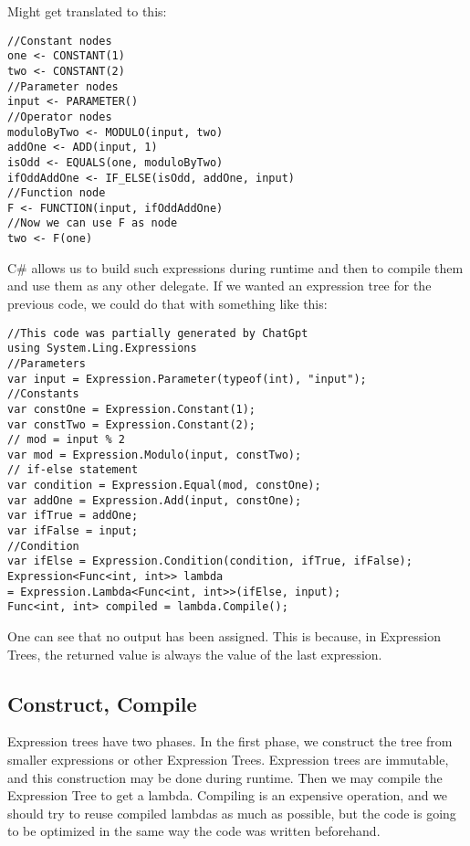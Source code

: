 Might get translated to this:
\begin{lstlisting}
//Constant nodes
one <- CONSTANT(1)
two <- CONSTANT(2)
//Parameter nodes
input <- PARAMETER()
//Operator nodes
moduloByTwo <- MODULO(input, two)
addOne <- ADD(input, 1)
isOdd <- EQUALS(one, moduloByTwo)
ifOddAddOne <- IF_ELSE(isOdd, addOne, input)
//Function node
F <- FUNCTION(input, ifOddAddOne)
//Now we can use F as node
two <- F(one)
\end{lstlisting}
    

C\# allows us to build such expressions during runtime and then to compile them and use them as any other delegate.
If we wanted an expression tree for the previous code, we could do that with something like this:

\begin{lstlisting}
//This code was partially generated by ChatGpt
using System.Ling.Expressions
//Parameters
var input = Expression.Parameter(typeof(int), "input");
//Constants
var constOne = Expression.Constant(1);
var constTwo = Expression.Constant(2);
// mod = input % 2 
var mod = Expression.Modulo(input, constTwo);
// if-else statement
var condition = Expression.Equal(mod, constOne);
var addOne = Expression.Add(input, constOne);
var ifTrue = addOne;
var ifFalse = input;
//Condition
var ifElse = Expression.Condition(condition, ifTrue, ifFalse);
Expression<Func<int, int>> lambda 
= Expression.Lambda<Func<int, int>>(ifElse, input);
Func<int, int> compiled = lambda.Compile();
\end{lstlisting}

One can see that no output has been assigned. This is because, in Expression Trees, the returned value is always the value of the last expression. 


\iffalse
\digraph{expressionTree1}{
  const_1 -> b0;
  input -> "+"
  const_1 -> "+"
  input -> "\%"
  "\%" -> "=="
  const_1 -> "=="
  "==" -> if [label = "check"]
  input -> if [label = "check is false"]
  "+" -> if [label = "check is true"]
}
\fi

\subsection{Construct, Compile}
Expression trees have two phases. In the first phase, we construct the tree from smaller expressions or other Expression Trees. Expression trees are immutable, and this construction may be done during runtime. 
Then we may compile the Expression Tree to get a lambda. Compiling is an expensive operation, and we should try to reuse compiled lambdas as much as possible, but the code is going to be optimized in the same way the code was written beforehand. 

